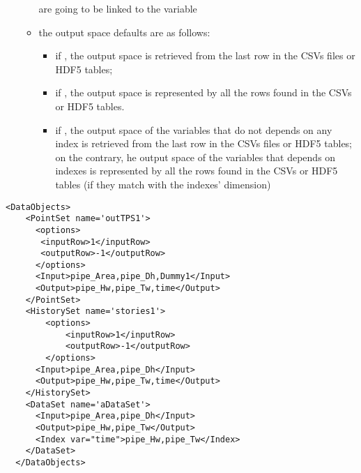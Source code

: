 \begin{itemize}
\begin{itemize}
          are going to be linked to the  variable
       \item  the output space defaults are as follows:
       \begin{itemize}
           \item if , the output space is retrieved from the last row in the CSVs files or HDF5 tables;
           \item if , the output space is represented by all the rows found in  the CSVs or HDF5 tables.
           \item if , the output space of the variables that do not depends on any index is retrieved from the last row in the CSVs files or HDF5 tables; 
           on the contrary, he output space of the variables that depends on indexes is represented by all the rows found in  the CSVs or HDF5 tables (if they match 
           with the indexes' dimension)
        \end{itemize}
    \end{itemize}
    
\end{itemize}

\begin{lstlisting}[style=XML,morekeywords={operator,hierarchical,name,var}]
  <DataObjects>
    <PointSet name='outTPS1'>
      <options>
       <inputRow>1</inputRow>
       <outputRow>-1</outputRow>
      </options>
      <Input>pipe_Area,pipe_Dh,Dummy1</Input>
      <Output>pipe_Hw,pipe_Tw,time</Output>
    </PointSet>
    <HistorySet name='stories1'>
        <options>
            <inputRow>1</inputRow>
            <outputRow>-1</outputRow>
        </options>
      <Input>pipe_Area,pipe_Dh</Input>
      <Output>pipe_Hw,pipe_Tw,time</Output>
    </HistorySet>
    <DataSet name='aDataSet'>
      <Input>pipe_Area,pipe_Dh</Input>
      <Output>pipe_Hw,pipe_Tw</Output>
      <Index var="time">pipe_Hw,pipe_Tw</Index>
    </DataSet>
  </DataObjects>
\end{lstlisting}

